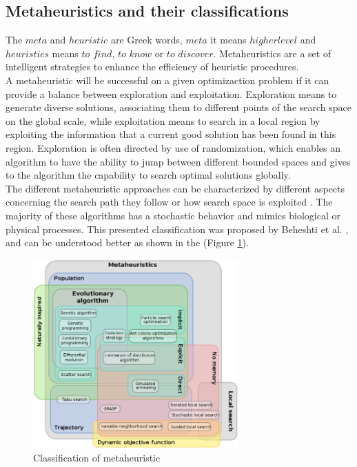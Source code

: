 \subsection{Metaheuristics and their classifications }
The $meta$ and $heuristic$ are Greek words, $meta$ it means $higher level$ and $heuristics$ means $to$ $find$, $to$ $know$ or $to$ $discover$. Metaheuristics are a set of intelligent strategies to enhance the efficiency of heuristic procedures.\\
A metaheuristic will be successful on a given optimizaction problem if it can provide a balance between exploration and exploitation. Exploration means to generate diverse solutions, associating them to different points of the search space on the global scale, while exploitation means to search in a local region by exploiting the information that a current good solution has been found in this region.
Exploration is often directed by use of randomization, which enables an algorithm to have the ability to jump between different bounded spaces and gives to the algorithm the capability to search optimal solutions globally.\\

The different metaheuristic approaches can be characterized by different aspects concerning the search path they follow or how search space is exploited \cite{citeulike:1859945}. The majority of these algorithms has a stochastic behavior and mimics biological or  physical processes. This presented classification was proposed by Beheshti et al. \cite{Beheshti:2014:CCA:2563733.2564085}, and can be understood better as shown in the (Figure \ref{fig:classification-of-mh}).

\squeezeup
\begin{figure}[ht] %
	\centering
  \includegraphics[width=0.70\textwidth]{MarcoTeorico/imagenes/classification_mh.png}
	\caption{Classification of metaheuristic}\label{fig:classification-of-mh}
\end{figure}
\squeezeup


